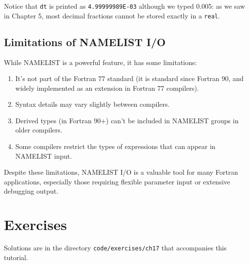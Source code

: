 Notice that \texttt{dt} is printed as \texttt{4.99999989E-03} although we typed 0.005: as we saw in Chapter 5, most decimal fractions cannot be stored exactly in a \texttt{real}.

\subsection{Limitations of NAMELIST I/O}

While NAMELIST is a powerful feature, it has some limitations:

\begin{enumerate}
    \item It's not part of the Fortran 77 standard (it is standard since Fortran 90, and widely implemented as an extension in Fortran 77 compilers).
    \item Syntax details may vary slightly between compilers.
    \item Derived types (in Fortran 90+) can't be included in NAMELIST groups in older compilers.
    \item Some compilers restrict the types of expressions that can appear in NAMELIST input.
\end{enumerate}

Despite these limitations, NAMELIST I/O is a valuable tool for many Fortran applications, especially those requiring flexible parameter input or extensive debugging output.

\section{Exercises}

Solutions are in the directory \texttt{code/exercises/ch17} that accompanies this tutorial.


